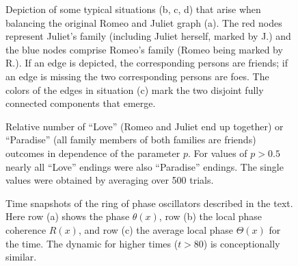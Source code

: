 \documentclass{scrartcl}
\begin{document}
\begin{figure}
    \centering
    \def\svgwidth{0.9\textwidth}
    
    \caption{Depiction of some typical situations (b, c, d) that arise when
        balancing the original Romeo and Juliet graph (a). The red nodes
        represent Juliet's family (including Juliet herself, marked by J.) and
        the blue nodes comprise Romeo's family (Romeo being marked by
        R.). If an edge is depicted, the corresponding persons are friends;
        if an edge is missing the two corresponding persons are foes. The
        colors of the edges in situation (c) mark the two disjoint fully
        connected components that emerge.}
    \label{fig:D41}
\end{figure}

\begin{figure}
    \centering
    \caption{Relative number of \enquote{Love} (Romeo and Juliet end up
    together) or \enquote{Paradise} (all family members of both families
    are friends) outcomes in dependence of the parameter $p$. For values of $p > 0.5$ nearly all
    \enquote{Love} endings were also \enquote{Paradise} endings. The single
    values were obtained by averaging over 500 trials.}
    \label{fig:D412}
\end{figure}

\begin{figure}
    \centering
    \caption{Time snapshots of the ring of phase oscillators described in
    the text. Here row (a) shows the phase $\theta(x)$, row (b) the local
    phase coherence $R(x)$, and row (c) the average local phase $\Theta(x)$
    for the time. The dynamic for higher times ($t > 80$) is conceptionally similar.}
    \label{fig:d42}
\end{figure}
\end{document}
